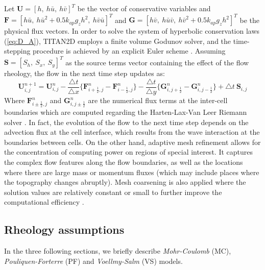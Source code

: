 \documentclass{article}
\begin{document}
Let $\textbf{U}=\left[h, \ h\bar{u}, \ h\bar{v}\right]^T$ be the vector of conservative variables and $\textbf{F}=\left[h\bar{u}, \ h\bar{u}^2+0.5 k_{ap} g_z h^2, \ h\bar{v}\bar{u}\right]^T$ and $\textbf{G}=\left[h\bar{v}, \ h\bar{u}\bar{v}, \ h\bar{v}^2+0.5 k_{ap} g_z h^2\right]^T$ be the physical flux vectors.
In order to solve the system of hyperbolic conservation laws (\ref{eq:D_A}), TITAN2D employs a finite volume Godunov solver, and the time-stepping procedure is achieved by an explicit Euler scheme \citep{Pitman2003a, Patra2005, Patra2006}. Assuming $\textbf{S}=\left[S_h, \ S_x, \ S_y\right]^T$ as the source terms vector containing the effect of the flow rheology, the flow in the next time step updates as:
\begin{equation}\label{integrator}
\textbf{U}_{i,j}^{n+1} = \textbf{U}_{i,j}^n - \frac{\bigtriangleup t}{\bigtriangleup x} \{\textbf{F}_{i+\frac{1}{2},j}^n - \textbf{F}_{i-\frac{1}{2},j}^n \} - \frac{\bigtriangleup t}{\bigtriangleup y} \{\textbf{G}_{i,j+\frac{1}{2}}^n - \textbf{G}_{i,j-\frac{1}{2}}^n \} + \bigtriangleup t \ \textbf{S}_{i,j}
\end{equation}
Where $\textbf{F}_{i\pm\frac{1}{2},j}^n$ and $\textbf{G}_{i,j\pm\frac{1}{2}}^n$ are the numerical flux terms at the inter-cell boundaries which are computed regarding the Harten-Lax-Van Leer Riemann solver \citep{Toro2013} . In fact, the evolution of the flow to the next time step depends on the advection flux at the cell interface, which results from the wave interaction at the boundaries between cells.
On the other hand, adaptive mesh refinement allows for the concentration of computing power on regions of special interest. It captures the complex flow features along the flow boundaries, as well as the locations where there are large mass or momentum fluxes (which may include places where the topography changes abruptly). Mesh coarsening is also applied where the solution values are relatively constant or small to further improve the computational efficiency \citep{Patra2005,Aghakhani2016}.

\subsection{Rheology assumptions}\label{subsec:Models}
In the three following sections, we briefly describe \emph{Mohr-Coulomb} (MC), \emph{Pouliquen-Forterre} (PF) and \emph{Voellmy-Salm} (VS) models.
\end{document}
